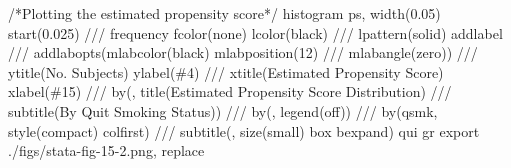 \documentclass[
  10pt,
  a4paper,
]{book}
\newenvironment{Shaded}{\begin{snugshade}}{\end{snugshade}}
\newcommand{\BaseNTok}[1]{\textcolor[rgb]{0.68,0.00,0.00}{#1}}
\newcommand{\CommentTok}[1]{\textcolor[rgb]{0.37,0.37,0.37}{#1}}
\newcommand{\KeywordTok}[1]{\textcolor[rgb]{0.00,0.46,0.62}{#1}}
\newcommand{\NormalTok}[1]{\textcolor[rgb]{0.00,0.46,0.62}{#1}}
\begin{document}
\begin{Shaded}
\begin{Highlighting}[]
\CommentTok{/*Plotting the estimated propensity score*/}
\KeywordTok{histogram}\NormalTok{ ps, }\KeywordTok{width}\NormalTok{(0.05) }\BaseNTok{start}\NormalTok{(0.025) }\CommentTok{///}
  \KeywordTok{frequency}\NormalTok{ fcolor(}\KeywordTok{none}\NormalTok{) lcolor(}\BaseNTok{black}\NormalTok{) }\CommentTok{///}
\NormalTok{  lpattern(solid) addlabel }\CommentTok{///}
  \BaseNTok{addlabopts}\NormalTok{(}\BaseNTok{mlabcolor}\NormalTok{(}\BaseNTok{black}\NormalTok{) }\BaseNTok{mlabposition}\NormalTok{(12) }\CommentTok{///}
  \BaseNTok{mlabangle}\NormalTok{(}\BaseNTok{zero}\NormalTok{)) }\CommentTok{///}
  \BaseNTok{ytitle}\NormalTok{(No. Subjects) }\KeywordTok{ylabel}\NormalTok{(\#4) }\CommentTok{///}
  \BaseNTok{xtitle}\NormalTok{(Estimated Propensity Score) }\KeywordTok{xlabel}\NormalTok{(\#15) }\CommentTok{///}
  \KeywordTok{by}\NormalTok{(, }\BaseNTok{title}\NormalTok{(Estimated Propensity Score Distribution) }\CommentTok{///}
  \BaseNTok{subtitle}\NormalTok{(By Quit Smoking Status)) }\CommentTok{///}
  \KeywordTok{by}\NormalTok{(, }\BaseNTok{legend}\NormalTok{(}\KeywordTok{off}\NormalTok{)) }\CommentTok{///}
  \KeywordTok{by}\NormalTok{(qsmk, style(compact) colfirst) }\CommentTok{///}
  \BaseNTok{subtitle}\NormalTok{(, }\KeywordTok{size}\NormalTok{(small) box bexpand)}
\KeywordTok{qui} \KeywordTok{gr} \KeywordTok{export}\NormalTok{ ./figs/stata{-}fig{-}15{-}2.png, }\KeywordTok{replace}
\end{Highlighting}
\end{Shaded}
\end{document}
